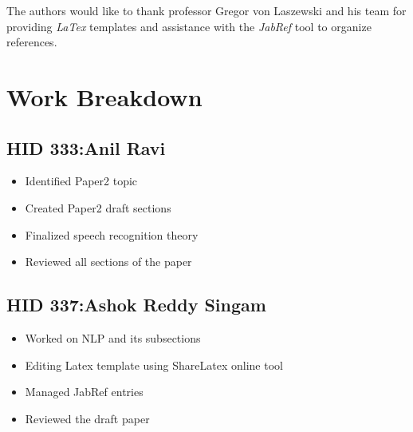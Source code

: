 \documentclass[sigconf]{acmart}
\begin{document}
\begin{acks}

  The authors would like to thank professor Gregor von Laszewski and his team for providing \textit{LaTex} templates and assistance with the \textit{JabRef} tool to organize references.


\end{acks}


 
\newpage
\appendix
\section{Work Breakdown}
\subsection{HID 333:Anil Ravi}
\begin{itemize}
  \item Identified Paper2 topic
  \item Created Paper2 draft sections
  \item Finalized speech recognition theory
  \item Reviewed all sections of the paper
\end{itemize}
\subsection{HID 337:Ashok Reddy Singam}
\begin{itemize}
  \item Worked on NLP and its subsections
  \item Editing Latex template using ShareLatex online tool
  \item Managed JabRef entries 
  \item Reviewed the draft paper 
\end{itemize}
\end{document}
